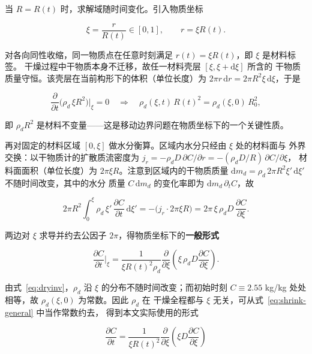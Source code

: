 当 $R=R(t)$ 时，求解域随时间变化。引入物质坐标

\begin{equation}
\xi=\frac{r}{R(t)}\in[0,1],\qquad r=\xi R(t).
\end{equation}

对各向同性收缩，同一物质点在任意时刻满足 $r(t)=\xi R(t)$，即 $\xi$ 是材料标签。
干燥过程中干物质本身不迁移，故任一材料壳层 $[\xi,\xi+\mathrm{d}\xi]$ 所含的
干物质质量守恒。该壳层在当前构形下的体积（单位长度）为
$2\pi r\,\mathrm{d}r=2\pi R^2\xi\,\mathrm{d}\xi$，于是

\begin{equation}
\frac{\partial}{\partial t}\Big(\rho_d\,\xi R^2\Big)\Big|_{\xi}=0
\quad\Longrightarrow\quad
\rho_d(\xi,t)\,R(t)^2=\rho_d(\xi,0)\,R_0^2 ,
\label{eq:dryinv}
\end{equation}

即 $\rho_dR^2$ 是材料不变量——这是移动边界问题在物质坐标下的一个关键性质。

再对固定的材料区域 $[0,\xi]$ 做水分衡算。区域内水分只经由 $\xi$ 处的材料面与
外界交换：以干物质计的扩散质流密度为
$j_r=-\rho_dD\,\partial C/\partial r=-(\rho_dD/R)\,\partial C/\partial \xi$，
材料面面积（单位长度）为 $2\pi\xi R$。注意到区域内的干物质质量
$\mathrm{d}m_d=\rho_d\,2\pi R^2\xi'\,\mathrm{d}\xi'$ 不随时间改变，其中的水分
质量 $C\,\mathrm{d}m_d$ 的变化率即为 $\mathrm{d}m_d\,\partial_tC$，故

\begin{equation}
2\pi R^2\!\!\int_0^{\xi}\!\rho_d\,\xi'\,
\frac{\partial C}{\partial t}\,\mathrm{d}\xi'
=-\big(j_r\cdot2\pi\xi R\big)
=2\pi\,\xi\,\rho_d D\,\frac{\partial C}{\partial \xi}.
\end{equation}

两边对 $\xi$ 求导并约去公因子 $2\pi$，得物质坐标下的\textbf{一般形式}

\begin{equation}
\frac{\partial C}{\partial t}\bigg|_{\xi}
=\frac{1}{\xi R(t)^2\rho_d}\frac{\partial}{\partial \xi}
\left(\xi\,\rho_d D\frac{\partial C}{\partial \xi}\right).
\label{eq:shrink-general}
\end{equation}

由式~\eqref{eq:dryinv}，$\rho_d$ 沿 $\xi$ 的分布不随时间改变；而初始时刻
$C\equiv2.55$ kg/kg 处处相等，故 $\rho_d(\xi,0)$ 为常数。因此 $\rho_d$ 在
干燥全程都与 $\xi$ 无关，可从式~\eqref{eq:shrink-general} 中当作常数约去，
得到本文实际使用的形式

\begin{equation}
\boxed{\ \frac{\partial C}{\partial t}
=\frac{1}{\xi R(t)^2}\frac{\partial}{\partial \xi}
\left(\xi D\frac{\partial C}{\partial \xi}\right)\ }
\label{eq:shrink}
\end{equation}

